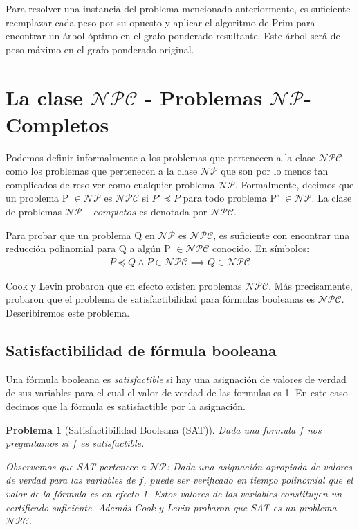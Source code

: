 \documentclass{article}
\newtheorem{problem}{Problema}
\begin{document}
Para resolver una instancia del problema mencionado anteriormente,
es suficiente reemplazar cada peso por su opuesto y aplicar el algoritmo
de Prim para encontrar un árbol óptimo en el grafo ponderado resultante.
Este árbol será de peso máximo en el grafo ponderado original.

\section*{La clase $\mathcal{NPC}$ - Problemas $\mathcal{NP}$-Completos}
Podemos definir informalmente a los problemas que pertenecen a la clase
$\mathcal{NPC}$ como los problemas que pertenecen a la clase $\mathcal{NP}$
que son por lo menos tan complicados de resolver como cualquier problema
$\mathcal{NP}$. Formalmente, decimos que un problema P $\in \mathcal{NP}$
es $\mathcal{NPC}$ si $P' \preceq P$ para todo problema P' $\in \mathcal{NP}$.
La clase de problemas $\mathcal{NP-}completos$ es denotada por $\mathcal{NPC}$.

Para probar que un problema Q en $\mathcal{NP}$ es $\mathcal{NPC}$,
es suficiente con encontrar una reducción polinomial para Q a algún P
$\in \mathcal{NPC}$ conocido. En símbolos:
\begin{align*}
    P \preceq Q \land P \in \mathcal{NPC} \implies Q\in   \mathcal{NPC}
\end{align*}

Cook y Levin probaron que en efecto existen problemas $\mathcal{NPC}$.
Más precisamente, probaron que el problema de satisfactibilidad para
fórmulas booleanas es $\mathcal{NPC}$. Describiremos este problema.

\subsection*{Satisfactibilidad de fórmula booleana}
Una fórmula booleana es \textit{satisfactible} si hay una asignación
de valores de verdad de sus variables para el cual el valor de
verdad de las formulas es 1. En este caso decimos que la fórmula
es satisfactible por la asignación.

\begin{problem}[Satisfactibilidad Booleana (SAT)]
Dada una formula $f$ nos preguntamos si $f$ es satisfactible.

Observemos que SAT pertenece a $\mathcal{NP}$: Dada una asignación
apropiada de valores de verdad para las variables de $f$, puede
ser verificado en tiempo polinomial que el valor de la fórmula
es en efecto 1. Estos valores de las variables constituyen
un certificado suficiente. Además Cook y Levin probaron que
SAT es un problema $\mathcal{NPC}$.
\end{problem}
\end{document}
